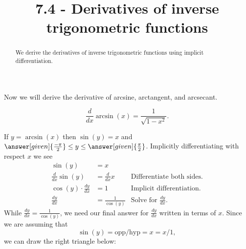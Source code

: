\documentclass{ximera}
\title{7.4 - Derivatives of inverse trigonometric functions}
\begin{document}
\begin{abstract}
  We derive the derivatives of inverse trigonometric functions using implicit
  differentiation.
\end{abstract}
\maketitle

Now we will derive the derivative of arcsine, arctangent, and
arcsecant.



\begin{theorem}
\[
\frac{d}{dx} \arcsin(x) = \frac{1}{\sqrt{1-x^2}}.
\]
\begin{explanation} 
  If $y=\arcsin(x)$ then $\sin(y) = x$ and $\answer[given]{\frac{-\pi}{2}}\le
  y\le \answer[given]{\frac{\pi}{2}}$.
  Implicitly differentiating with respect $x$ we see
  \begin{align*}
    \sin(y) &= x\\
    \frac{d}{dx} \sin(y) &= \frac{d}{dx} x &\text{Differentiate both sides.}\\
    \cos(y) \cdot \frac{dy}{dx} &= 1 &\text{Implicit differentiation.}\\
    \frac{dy}{dx} &= \frac{1}{\cos(y)} &\text{Solve for $\frac{dy}{dx}$.}
  \end{align*}
  While $\frac{dy}{dx} = \frac{1}{\cos(y)}$, we need our final answer for $\frac{dy}{dx}$ written
  in terms of $x$. Since we are assuming that
  \[
  \sin(y) =\mbox{opp/hyp}= x=x/1,
  \]
  we can draw the right triangle below:
      \begin{image}[2in]
    \end{image}


\end{explanation}
\end{theorem}
\end{document}
